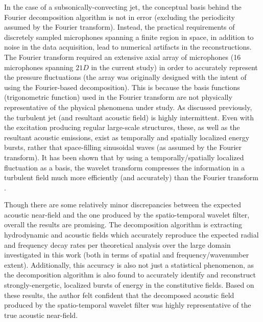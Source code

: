 In the case of a subsonically-convecting jet, the conceptual basis behind the Fourier decomposition algorithm is not in error (excluding the periodicity assumed by the Fourier transform). 
Instead, the practical requirements of discretely sampled microphones spanning a finite region in space, in addition to noise in the data acquisition, lead to numerical artifacts in the reconstructions. 
The Fourier transform required an extensive axial array of microphones (16 microphones spanning $21D$ in the current study) in order to accurately represent the pressure fluctuations (the array was originally designed with the intent of using the  Fourier-based decomposition).  
This is because the basis functions (trigonometric function) used in the Fourier transform are not physically representative of the physical phenomena under study. 
As discussed previously, the turbulent jet (and resultant acoustic field) is highly intermittent. 
Even with the excitation producing regular large-scale structures, these, as well as the resultant acoustic emissions, exist as temporally and spatially localized energy bursts, rather that space-filling sinusoidal waves (as assumed by the Fourier transform). 
It has been shown that by using a temporally/spatially localized fluctuation as a basis, the wavelet transform compresses the information in a turbulent field much more efficiently (and accurately) than the Fourier transform \citep{Farge1992}.

Though there are some relatively minor discrepancies between the expected acoustic near-field and the one produced by the spatio-temporal wavelet filter, overall the results are promising.
The decomposition algorithm is extracting hydrodynamic and acoustic fields which accurately reproduce the expected radial and frequency decay rates per theoretical analysis over the large domain investigated in this work (both in terms of spatial and frequency/wavenumber extent).
Additionally, this accuracy is also not just a statistical phenomenon, as the decomposition algorithm is also found to accurately identify and reconstruct strongly-energetic, localized bursts of energy in the constitutive fields. 
Based on these results, the author felt confident that the decomposed acoustic field produced by the spatio-temporal wavelet filter was highly representative of the true acoustic near-field.

